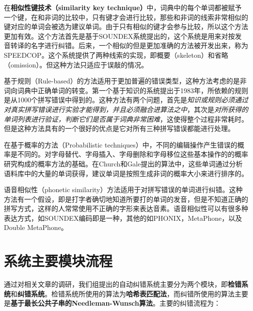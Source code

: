 \documentclass[UTF8,a4paper]{ctexart}
\begin{document}
在\textbf{相似性键技术（similarity key technique）}中，词典中的每个单词都被赋予一个键，在和非词的比较中，只有键才会进行比较，那些和非词的线索非常相似的键对应的单词会被选为建议单词。由于只有相似的键才会参与比较，所以这个方法更加有效。这个方法首先是基于SOUNDEX系统\cite{odell1918soundex}提出的，这个系统是用来对按发音转译的名字进行纠错。后来，一个相似的但是更加准确的方法被开发出来，称为SPEEDCOP\cite{pollock1984system}。这个系统提供了两种线索的实现，即概要（skeleton）和省略（omission）。但这种方法只适应于误敲的情况。

基于规则（Rule-based）的方法适用于更加普遍的错误类型，这种方法考虑的是非词向词典中正确单词的转变。第一个基于知识的系统提出于1983年\cite{yannakoudakis1983intelligent,yannakoudakis1983rules}，所依赖的规则是从1000个拼写错误中得到的。这种方法有两个问题，首先是\textit{知识或规则必须通过对真实拼写错误进行实验才能得到，并且必须融合进算法之中}，其次是\textit{对所获得的单词列表进行验证，判断它们是否属于词典非常困难}，这使得整个过程非常耗时。但是这种方法具有的一个很好的优点是它对所有三种拼写错误都能进行处理。

在基于概率的方法（Probabilistic techniques）中，不同的编辑操作产生错误的概率是不同的。对字母替代、字母插入、字母删除和字母移位这些基本操作的的概率研究构成的概率方法的基础。在Church和Gale提出的算法\cite{church1991probability}中，这些单词通过分析语料库中的大量的单词获得，建议单词是按照生成非词的概率大小来进行排序的。

语音相似性（phonetic similarity）方法适用于对拼写错误的单词进行纠错。这种方法有一个假设，即是打字者确切地知道所要打的单词的发音，但是不知道正确的拼写方式，这样的人常常使用不正确的字形来表达音素。语音相似性可以有很多种表达方式，如SOUNDEX编码\cite{odell1918soundex}即是一种，其他的如PHONIX\cite{gadd1990phonix}，MetaPhone\cite{philips1990hanging}，以及Double MetaPhone\cite{philips2000double}。

\section{系统主要模块流程}

通过对相关文章的调研，我们组提出的自动纠错系统主要分为两个模块，即\textbf{检错系统}和\textbf{纠错系统}。检错系统所使用的算法为\textbf{哈希表匹配法}，而纠错所使用的算法主要是\textbf{基于最长公共子串的Needleman-Wunsch算法}。主要的纠错流程为：
\end{document}

